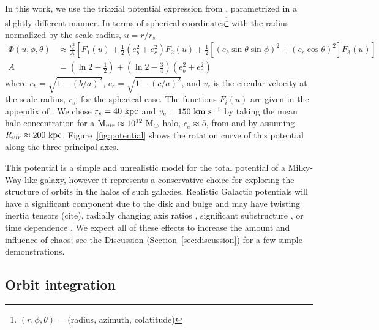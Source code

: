 \documentclass[letterpaper,12pt,preprint]{aastex}
\newcommand{\msun}{\ensuremath{\mathrm{M}_\odot}}
\begin{document}
In this work, we use the triaxial potential expression from \citet{leesuto03}, parametrized in a slightly different manner. In terms of spherical coordinates\footnote{$(r,\phi,\theta)$ = (radius, azimuth, colatitude)} with the radius normalized by the scale radius, $u = r/r_s$
\begin{align}
	\Phi(u,\phi,\theta) &\approx \frac{v_c^2}{A}\left[F_1(u) + \frac{1}{2}(e_b^2 + e_c^2)F_2(u) + \frac{1}{2} [(e_b\sin\theta \sin\phi)^2 + (e_c\cos\theta)^2] F_3(u) \right]\\
	A &= \left(\ln2 - \frac{1}{2}\right) + \left(\ln2-\frac{3}{4}\right) (e_b^2 + e_c^2)
\end{align}
where $e_b = \sqrt{1 - (b/a)^2}$, $e_c = \sqrt{1 - (c/a)^2}$, and $v_c$ is the circular velocity at the scale radius, $r_s$, for the spherical case. The functions $F_i(u)$ are given in the appendix of \cite{leesuto03}. We chose $r_s=40~{\rm kpc}$ and $v_c = 150~{\rm km}~{\rm s}^{-1}$ by taking the mean halo concentration for a ${\rm M}_{vir} \approx 10^{12}~\msun$ halo, $c_e\approx5$, from \cite{jing02} and by assuming $R_{vir}\approx200~{\rm kpc}$. Figure~\ref{fig:potential} shows the rotation curve of this potential along the three principal axes.


This potential is a simple and unrealistic model for the total potential of a Milky-Way-like galaxy, however it represents a conservative choice for exploring the structure of orbits in the halos of such galaxies. Realistic Galactic potentials will have a significant component due to the disk and bulge and may have twisting inertia tensors (cite), radially changing axis ratios \citep[e.g.,][]{kazantzidis04,debattista08,veraciro11, NiHao}, significant substructure \citep{moore98,zemp09}, or time dependence \citep[either from bulk rotation, mass growth, mergers, etc.][]{bailin05}. We expect all of these effects to increase the amount and influence of chaos; see the Discussion (Section~\ref{sec:discussion}) for a few simple demonstrations.

\subsection{Orbit integration}\label{sec:integration}
\end{document}

